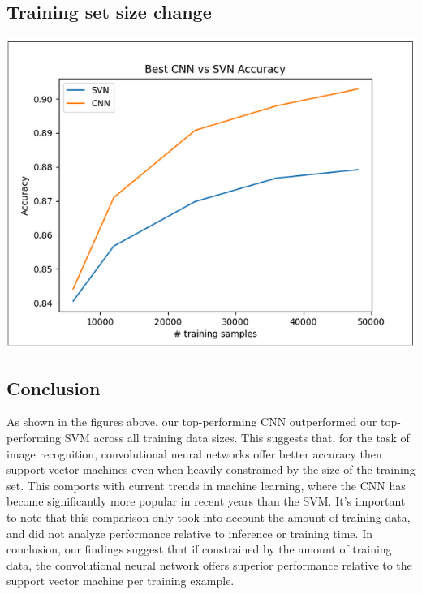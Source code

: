 \documentclass[12pt]{article}
\begin{document}
\subsection{Training set size change}

\includegraphics[scale=.75]{versusgraph1.PNG}

\subsection{Conclusion}

As shown in the figures above, our top-performing CNN outperformed our top-performing SVM across all training data sizes. This suggests that, for the task of image recognition, convolutional neural networks offer better accuracy then support vector machines even when heavily constrained by the size of the training set. This comports with current trends in machine learning, where the CNN has become significantly more popular in recent years than the SVM. It’s important to note that this comparison only took into account the amount of training data, and did not analyze performance relative to inference or training time. In conclusion, our findings suggest that if constrained by the amount of training data, the convolutional neural network offers superior performance relative to the support vector machine per training example.
\end{document}

